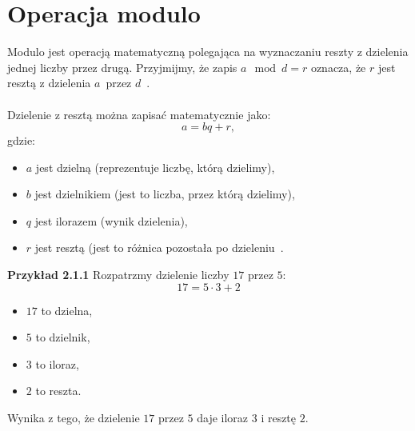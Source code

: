 \documentclass{SGGW-thesis}
\begin{document}
	\section{Operacja modulo}
	Modulo jest operacją matematyczną polegająca na wyznaczaniu reszty z dzielenia jednej liczby przez drugą. Przyjmijmy, że zapis \( a \mod d = r \) oznacza, że \( r \) jest resztą z dzielenia \( a \)~przez \( d \)~\cite{ajakubiec}\cite{r21modulo}\cite{kennweth}.
	\\
	\\
	Dzielenie z resztą można zapisać matematycznie jako:
	\begin{equation}
		a = bq + r,
	\end{equation}
	gdzie:
	\begin{itemize}
		\item \( a \) jest dzielną (reprezentuje liczbę, którą dzielimy),
		\item \( b \) jest dzielnikiem (jest to liczba, przez którą dzielimy),
		\item \( q \) jest ilorazem (wynik dzielenia),
		\item \( r \) jest resztą (jest to różnica pozostała po dzieleniu~\cite{kennweth}.
	\end{itemize}
	\vspace{1em}
	\noindent \textbf{Przykład 2.1.1} Rozpatrzmy dzielenie liczby \( 17 \) przez \( 5 \):
	\[ 17 = 5 \cdot 3 + 2 \]
	\begin{itemize}
		\item \( 17 \) to dzielna,
		\item \( 5 \) to dzielnik,
		\item \( 3 \) to iloraz,
		\item \( 2 \) to reszta.
	\end{itemize}
	
	\noindent Wynika z tego, że dzielenie \( 17 \) przez \( 5 \) daje iloraz \( 3 \) i resztę \( 2 \).
	\newpage
	
\end{document}
